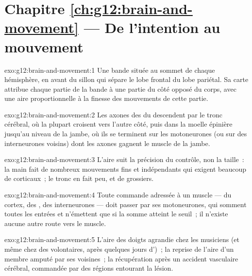 \section*{Chapitre \ref{ch:g12:brain-and-movement} --- De l'intention au mouvement}

\begin{solution}{exo:g12:brain-and-movement:1}
Une bande située au sommet de chaque hémisphère, en avant du sillon
qui sépare le lobe frontal du lobe pariétal. Sa carte attribue chaque
partie de la bande à une partie du côté opposé du corps, avec une aire
proportionnelle à la finesse des mouvements de cette partie.
\end{solution}

\begin{solution}{exo:g12:brain-and-movement:2}
Les axones des  du  descendent par le tronc
cérébral, où la plupart croisent vers l'autre côté, puis dans la
moelle épinière jusqu'au niveau de la jambe, où ils se terminent sur
les motoneurones (ou sur des interneurones voisins) dont les axones
gagnent le muscle de la jambe.
\end{solution}

\begin{solution}{exo:g12:brain-and-movement:3}
L'aire suit la précision du contrôle, non la taille~: la main fait de
nombreux mouvements fins et indépendants qui exigent beaucoup de
 corticaux~; le tronc en fait peu, et de grossiers.
\end{solution}

\begin{solution}{exo:g12:brain-and-movement:4}
Toute commande adressée à un muscle --- du cortex, des ,
des interneurones --- doit passer par ses motoneurones, qui somment
toutes les entrées et n'émettent que si la somme atteint le seuil~; il
n'existe aucune autre route vers le muscle.
\end{solution}

\begin{solution}{exo:g12:brain-and-movement:5}
L'aire des doigts agrandie chez les musiciens (et même chez des
volontaires, après quelques jours d')~; la reprise de l'aire d'un
membre amputé par ses voisines~; la récupération après un accident
vasculaire cérébral, commandée par des régions entourant la lésion.
\end{solution}

